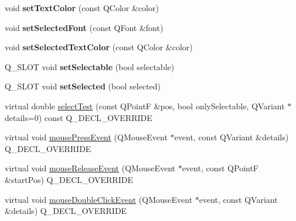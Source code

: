 \begin{DoxyCompactItemize}
\item 
void {\bfseries set\+Text\+Color} (const Q\+Color \&color)\hypertarget{class_q_c_p_text_element_a4f3b8361c3ffb3f84346954929ce93ba}{}\label{class_q_c_p_text_element_a4f3b8361c3ffb3f84346954929ce93ba}

\item 
void {\bfseries set\+Selected\+Font} (const Q\+Font \&font)\hypertarget{class_q_c_p_text_element_a0a2397a3c4ede519e16ab3e991904065}{}\label{class_q_c_p_text_element_a0a2397a3c4ede519e16ab3e991904065}

\item 
void {\bfseries set\+Selected\+Text\+Color} (const Q\+Color \&color)\hypertarget{class_q_c_p_text_element_abaec200cae70a0eade53583defc0476d}{}\label{class_q_c_p_text_element_abaec200cae70a0eade53583defc0476d}

\item 
Q\+\_\+\+S\+L\+OT void {\bfseries set\+Selectable} (bool selectable)\hypertarget{class_q_c_p_text_element_a1a732a20a52faea6de88fd6beca96ec3}{}\label{class_q_c_p_text_element_a1a732a20a52faea6de88fd6beca96ec3}

\item 
Q\+\_\+\+S\+L\+OT void {\bfseries set\+Selected} (bool selected)\hypertarget{class_q_c_p_text_element_a9fb83ff13660adfa0d491af1b079d626}{}\label{class_q_c_p_text_element_a9fb83ff13660adfa0d491af1b079d626}

\item 
virtual double \hyperlink{class_q_c_p_text_element_a29d2998b50ef369d88ca990b9d3542b3}{select\+Test} (const Q\+PointF \&pos, bool only\+Selectable, Q\+Variant $\ast$details=0) const Q\+\_\+\+D\+E\+C\+L\+\_\+\+O\+V\+E\+R\+R\+I\+DE
\item 
virtual void \hyperlink{class_q_c_p_text_element_aa52d0292e7444526cccd453945238f4b}{mouse\+Press\+Event} (Q\+Mouse\+Event $\ast$event, const Q\+Variant \&details) Q\+\_\+\+D\+E\+C\+L\+\_\+\+O\+V\+E\+R\+R\+I\+DE
\item 
virtual void \hyperlink{class_q_c_p_text_element_a97d566f46653bb0b00a2c1556e6c1f7e}{mouse\+Release\+Event} (Q\+Mouse\+Event $\ast$event, const Q\+PointF \&start\+Pos) Q\+\_\+\+D\+E\+C\+L\+\_\+\+O\+V\+E\+R\+R\+I\+DE
\item 
virtual void \hyperlink{class_q_c_p_text_element_a45dcc9c527018f879c28b0d61b57147f}{mouse\+Double\+Click\+Event} (Q\+Mouse\+Event $\ast$event, const Q\+Variant \&details) Q\+\_\+\+D\+E\+C\+L\+\_\+\+O\+V\+E\+R\+R\+I\+DE
\end{DoxyCompactItemize}
